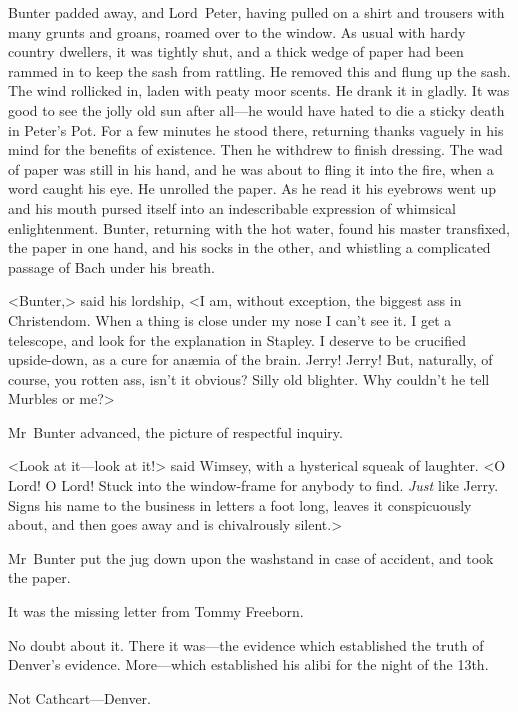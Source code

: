 Bunter padded away, and Lord~Peter, having pulled on a shirt and trousers with many grunts and groans, roamed over to the window. As usual with hardy country dwellers, it was tightly shut, and a thick wedge of paper had been rammed in to keep the sash from rattling. He removed this and flung up the sash. The wind rollicked in, laden with peaty moor scents. He drank it in gladly. It was good to see the jolly old sun after all—he would have hated to die a sticky death in Peter's Pot. For a few minutes he stood there, returning thanks vaguely in his mind for the benefits of existence. Then he withdrew to finish dressing. The wad of paper was still in his hand, and he was about to fling it into the fire, when a word caught his eye. He unrolled the paper. As he read it his eyebrows went up and his mouth pursed itself into an indescribable expression of whimsical enlightenment. Bunter, returning with the hot water, found his master transfixed, the paper in one hand, and his socks in the other, and whistling a complicated passage of Bach under his breath.

<Bunter,> said his lordship, <I am, without exception, the biggest ass in Christendom. When a thing is close under my nose I can't see it. I get a telescope, and look for the explanation in Stapley. I deserve to be crucified upside-down, as a cure for anæmia of the brain. Jerry!  Jerry! But, naturally, of course, you rotten ass, isn't it obvious?  Silly old blighter. Why couldn't he tell Murbles or me?>

Mr~Bunter advanced, the picture of respectful inquiry.

<Look at it—look at it!> said Wimsey, with a hysterical squeak of laughter. <O Lord! O Lord! Stuck into the window-frame for anybody to find. \emph{Just} like Jerry. Signs his name to the business in letters a foot long, leaves it conspicuously about, and then goes away and is chivalrously silent.>

Mr~Bunter put the jug down upon the washstand in case of accident, and took the paper.

It was the missing letter from Tommy Freeborn.

No doubt about it. There it was—the evidence which established the truth of Denver's evidence. More—which established his alibi for the night of the 13th.

Not Cathcart—Denver.

